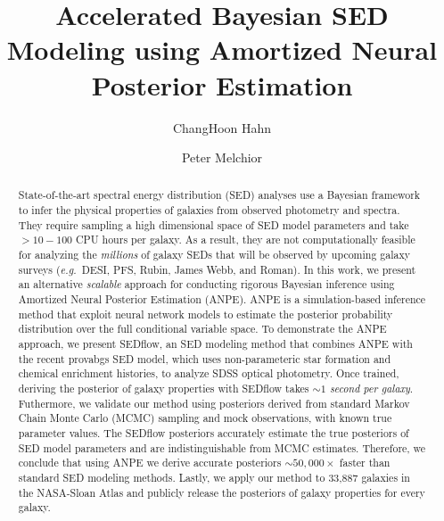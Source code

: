 \documentclass[12pt, letterpaper, preprint, comicneue]{aastex63}
\newcommand{\eg}{\emph{e.g.}}
\begin{document}
 \sloppy\sloppypar\frenchspacing 

\title{Accelerated Bayesian SED Modeling using Amortized Neural Posterior Estimation}

\author[0000-0003-1197-0902]{ChangHoon Hahn}

\author{Peter Melchior}

\begin{abstract}
    State-of-the-art spectral energy distribution (SED) analyses use a
    Bayesian framework to infer the physical properties of galaxies from
    observed photometry and spectra.
    They require sampling a high dimensional space of SED model parameters and
    take $>10-100$ CPU hours per galaxy. 
    As a result, they are not computationally feasible for analyzing the {\em
    millions} of galaxy SEDs that will be observed by upcoming galaxy surveys
    (\eg~DESI, PFS, Rubin, James Webb, and Roman). 
    In this work, we present an alternative \emph{scalable} approach for
    conducting rigorous Bayesian inference using Amortized Neural Posterior
    Estimation (ANPE). 
    ANPE is a simulation-based inference method that exploit neural network
    models to estimate the posterior probability distribution over the full
    conditional variable space.
    To demonstrate the ANPE approach, we present {\sc SEDflow}, an SED modeling
    method that combines ANPE with the recent \cite{hahn2022}
    {\sc provabgs} SED model, which uses non-parameteric star formation and
    chemical enrichment histories, to analyze SDSS optical photometry. 
    Once trained, deriving the posterior of galaxy properties with {\sc
    SEDflow} takes \emph{${\sim}1$ second per galaxy}. 
    Futhermore, we validate our method using posteriors derived from standard
    Markov Chain Monte Carlo (MCMC) sampling and mock observations, with known
    true parameter values.  
    The {\sc SEDflow} posteriors accurately estimate the true posteriors of SED
    model parameters and are indistinguishable from MCMC estimates.    
    Therefore, we conclude that using ANPE we derive accurate posteriors
    ${\sim}50,000\times$ faster than standard SED modeling methods. 
    Lastly, we apply our method to 33,887 galaxies in the NASA-Sloan Atlas and
    publicly release the posteriors of galaxy properties for every galaxy.
\end{abstract}
\end{document}

